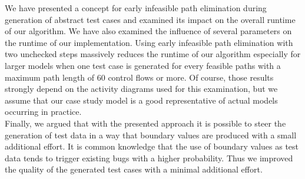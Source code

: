 We have presented a concept for early infeasible path elimination during generation of abstract test cases and examined its impact on the overall runtime of our algorithm. We have also examined the influence of several parameters on the runtime of our implementation. Using early infeasible path elimination with two unchecked steps massively reduces the runtime of our algorithm especially for larger models when one test case is generated for every feasible paths with a maximum path length of 60 control flows or more. Of course, those results strongly depend on the activity diagrams used for this examination, but we assume that our case study model is a good representative of actual models occurring in practice.\\
Finally, we argued that with the presented approach it is possible to steer the generation of test data in a way that boundary values are produced with a small additional effort. 
It is common knowledge that the use of boundary values as test data tends to trigger existing bugs with a higher probability. Thus we improved the quality of the generated test cases with a minimal additional effort.

